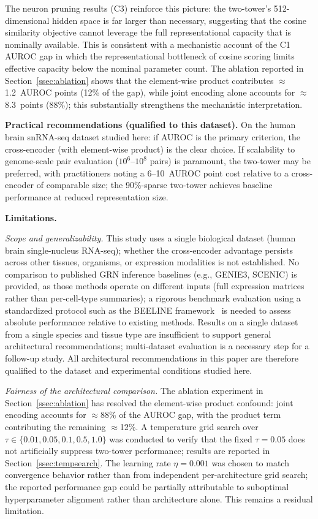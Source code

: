\documentclass[journal]{IEEEtran}
\begin{document}
The neuron pruning results (C3) reinforce this picture: the two-tower's
512-dimensional hidden space is far larger than necessary, suggesting that the
cosine similarity objective cannot leverage the full representational capacity
that is nominally available. This is consistent with a mechanistic account of
the C1 AUROC gap in which the representational bottleneck of cosine scoring
limits effective capacity below the nominal parameter count. The ablation reported in Section~\ref{ssec:ablation} shows that the
element-wise product contributes $\approx$1.2~AUROC points (12\% of the gap),
while joint encoding alone accounts for $\approx$8.3~points (88\%); this
substantially strengthens the mechanistic interpretation.

\textbf{Practical recommendations (qualified to this dataset).}
On the human brain snRNA-seq dataset studied here: if AUROC is the primary
criterion, the cross-encoder (with element-wise product) is the clear choice.
If scalability to genome-scale pair evaluation ($10^6$--$10^8$ pairs) is
paramount, the two-tower may be preferred, with practitioners noting a
6--10~AUROC point cost relative to a cross-encoder of comparable size; the
90\%-sparse two-tower
achieves baseline performance at reduced representation size.

\textbf{Limitations.}

\emph{Scope and generalizability.}
This study uses a single biological dataset (human brain single-nucleus
RNA-seq); whether the cross-encoder advantage persists across other tissues,
organisms, or expression modalities is not established.
No comparison to published GRN inference baselines (e.g., GENIE3, SCENIC) is
provided, as those methods operate on different inputs (full expression
matrices rather than per-cell-type summaries); a rigorous benchmark evaluation
using a standardized protocol such as the BEELINE framework~\cite{pratapa2020}
is needed to assess absolute performance relative to existing methods. Results
on a single dataset from a single species and tissue type are insufficient to
support general architectural recommendations; multi-dataset evaluation is a
necessary step for a follow-up study. All architectural recommendations in this
paper are therefore qualified to the dataset and experimental conditions
studied here.

\emph{Fairness of the architectural comparison.}
The ablation experiment in Section~\ref{ssec:ablation} has resolved the
element-wise product confound: joint encoding accounts for $\approx$88\% of
the AUROC gap, with the product term contributing the remaining $\approx$12\%.
A temperature grid search over $\tau \in \{0.01, 0.05, 0.1, 0.5, 1.0\}$ was
conducted to verify that the fixed $\tau = 0.05$ does not artificially suppress
two-tower performance; results are reported in Section~\ref{ssec:tempsearch}.
The learning rate $\eta = 0.001$ was chosen to match convergence behavior
rather than from independent per-architecture grid search; the reported
performance gap could be partially attributable to suboptimal hyperparameter
alignment rather than architecture alone. This remains a residual limitation.
\end{document}
